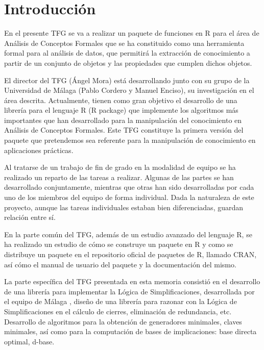 \section{Introducci\'on}

En el presente TFG se va a realizar un paquete de funciones en R para el \'area de An\'alisis de Conceptos Formales que se ha constituido como una herramienta formal para al an\'alisis de datos, que permitir\'a la extracci\'on de conocimiento a partir de un conjunto de objetos y las propiedades que cumplen dichos objetos.

El director del TFG (\'Angel Mora) est\'a desarrollando junto con su grupo de la Universidad de M\'alaga (Pablo Cordero y Manuel Enciso), su investigaci\'on en el \'area descrita. Actualmente, tienen como gran objetivo el desarrollo de una librer\'ia para el lenguaje R (R package) que implemente los algoritmos m\'as importantes que han desarrollado para la manipulaci\'on del conocimiento en  An\'alisis de Conceptos Formales. Este TFG constituye la primera versi\'on del paquete que pretendemos sea referente para la manipulaci\'on de conocimiento en aplicaciones pr\'acticas.

Al tratarse de un trabajo de fin de grado en la modalidad de equipo se ha realizado un reparto de las tareas a realizar. Algunas de las partes se han desarrollado conjuntamente, mientras que otras han sido desarrolladas por cada uno de los miembros del equipo de forma individual. Dada la naturaleza de este proyecto, aunque las tareas individuales estaban bien diferenciadas, guardan relaci\'on entre s\'i.

En la parte com\'un del TFG, adem\'as de un estudio avanzado del lenguaje R, se ha realizado un estudio de c\'omo se construye un paquete en R y como se distribuye un paquete en el repositorio oficial de paquetes de R, llamado CRAN, as\'i c\'omo el manual de usuario del paquete y la documentaci\'on del mismo.

La parte espec\'ifica del TFG presentada en esta memoria consisti\'o en el desarrollo de una librer\'ia para implementar la L\'ogica de Simplificaciones, desarrollada por el equipo de M\'alaga \cite{Cordero2002}, dise\~no de una librer\'ia para razonar con la L\'ogica de Simplificaciones en el c\'alculo de cierres, eliminaci\'on de redundancia, etc. Desarrollo de algoritmos para la obtenci\'on de generadores minimales, claves minimales, as\'i como para la computaci\'on de bases de implicaciones: base directa optimal, d-base.\\ 

